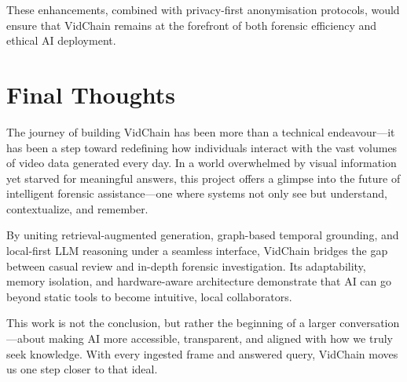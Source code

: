These enhancements, combined with privacy-first anonymisation protocols, would ensure that VidChain remains at the forefront of both forensic efficiency and ethical AI deployment.

\section{Final Thoughts}

The journey of building VidChain has been more than a technical endeavour---it has been a step toward redefining how individuals interact with the vast volumes of video data generated every day. In a world overwhelmed by visual information yet starved for meaningful answers, this project offers a glimpse into the future of intelligent forensic assistance---one where systems not only see but understand, contextualize, and remember.

By uniting retrieval-augmented generation, graph-based temporal grounding, and local-first LLM reasoning under a seamless interface, VidChain bridges the gap between casual review and in-depth forensic investigation. Its adaptability, memory isolation, and hardware-aware architecture demonstrate that AI can go beyond static tools to become intuitive, local collaborators.

This work is not the conclusion, but rather the beginning of a larger conversation---about making AI more accessible, transparent, and aligned with how we truly seek knowledge. With every ingested frame and answered query, VidChain moves us one step closer to that ideal.